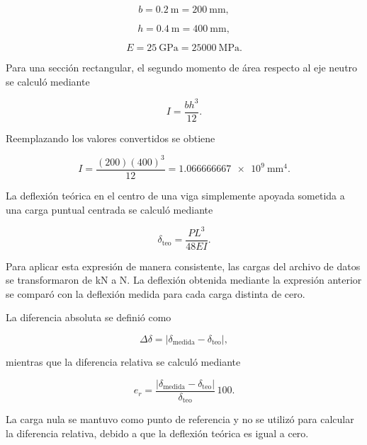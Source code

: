 \begin{equation}
b=\SI{0,2}{\meter}=\SI{200}{\milli\meter},
\end{equation}

\begin{equation}
h=\SI{0,4}{\meter}=\SI{400}{\milli\meter},
\end{equation}

\begin{equation}
E=\SI{25}{\giga\pascal}=\SI{25000}{\mega\pascal}.
\end{equation}

Para una sección rectangular, el segundo momento de área respecto al eje neutro se calculó mediante

\begin{equation}
I=\frac{bh^3}{12}.
\end{equation}

Reemplazando los valores convertidos se obtiene

\begin{equation}
I=
\frac{(200)(400)^3}{12}
=
\SI{1,066666667e9}{\milli\meter^4}.
\end{equation}

La deflexión teórica en el centro de una viga simplemente apoyada sometida a una carga puntual centrada se calculó mediante \cite{Roylance2000}

\begin{equation}
\delta_{\mathrm{teo}}=
\frac{PL^3}{48EI}.
\end{equation}

Para aplicar esta expresión de manera consistente, las cargas del archivo de datos se transformaron de \si{\kilo\newton} a \si{\newton}. La deflexión obtenida mediante la expresión anterior se comparó con la deflexión medida para cada carga distinta de cero.

La diferencia absoluta se definió como

\begin{equation}
\Delta \delta =
\left|
\delta_{\mathrm{medida}}
-
\delta_{\mathrm{teo}}
\right|,
\end{equation}

mientras que la diferencia relativa se calculó mediante

\begin{equation}
e_r=
\frac{
\left|
\delta_{\mathrm{medida}}
-
\delta_{\mathrm{teo}}
\right|
}{
\delta_{\mathrm{teo}}
}
\,100.
\end{equation}

La carga nula se mantuvo como punto de referencia y no se utilizó para calcular la diferencia relativa, debido a que la deflexión teórica es igual a cero.



